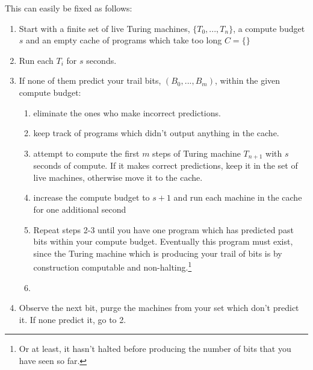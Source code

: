 \documentclass[12pt,authoryear]{elsarticle}
\begin{document}
This can easily be fixed as follows:

\begin{enumerate}
	\item Start with a finite set of live Turing machines, $\{T_0, ..., T_n\}$, a compute budget $s$ and an empty cache of programs which take too long $C =\{\}$
	\item Run each $T_i$ for $s$ seconds. 
	\item If none of them predict your trail bits, $(B_0, ..., B_m)$, within the given compute budget: 
		\begin{enumerate}
		   \item eliminate the ones who make incorrect predictions.
			 \item keep track of programs which didn't output anything in the cache.
			 \item attempt to compute the first $m$ steps of Turing machine $T_{n+1}$ with $s$ seconds of compute. If it makes correct predictions, keep it in the set of live machines, otherwise move it to the cache.
			 \item increase the compute budget to $s + 1$ and run each machine in the cache for one additional second
			 \item Repeat steps 2-3 until you have one program which has predicted past bits within your compute budget. Eventually this program must exist, since the Turing machine which is producing your trail of bits is by construction computable and non-halting.\footnote{Or at least, it hasn't halted before producing the number of bits that you have seen so far.}
			\item 
		\end{enumerate}
	\item Observe the next bit, purge the machines from your set which don't predict it. If none predict it, go to 2.
\end{enumerate}
\end{document}
